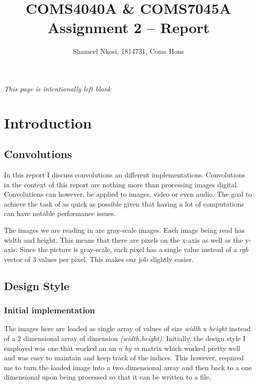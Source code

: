 

\title{COMS4040A \& COMS7045A Assignment 2 -- Report}
\author{Shameel Nkosi, 1814731, Coms Hons}
\maketitle 
\pagestyle{fancy}
\fancyhf{}
\fancyhead[R]{\thepage}
\newpage
\tableofcontents
\newpage
\begin{center}
	\textit{This page is intentionally left blank}
\end{center}
\newpage
{}
\section*{Introduction}
\subsection*{Convolutions}
In this report I discuss convolutions an different implementations. Convolutions in the context of this report are nothing more than processing images digital. Convolutions can however, be applied to images, video or even audio. The goal to achieve the task of as quick as possible given that having a lot of computations can have notable performance issues.

The images we are reading in are gray-scale images. Each image being read has width and height. This means that there are pixels on the x-axis as well as the y-axis. Since the picture is gray-scale, each pixel has a single value instead of a \textit{rgb} vector of 3 values per pixel. This makes our job slightly easier. 

\subsection*{Design Style}
\subsubsection*{Initial implementation}
 The images here are loaded as single array of values of size \textit{width} x \textit{height} instead of a 2 dimensional array of dimension \textit{(width,height)}. Initially, the design style I employed was one that worked on an \textit{n by m} matrix which worked pretty well and was easy to maintain and keep track of the indices. This however, required me to turn the loaded image into a two dimensional array and then back to a one dimensional upon being processed so that it can be written to a file. 
 
